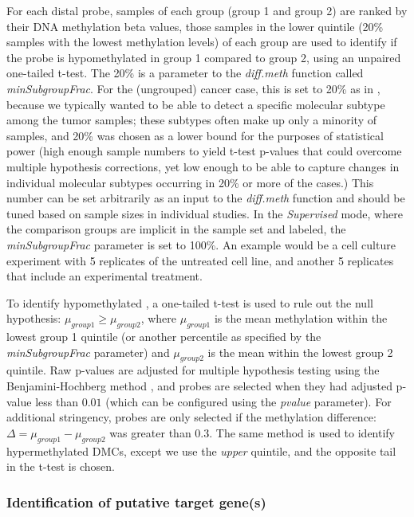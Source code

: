 For each distal probe, samples of each group (group 1 and group 2) are ranked by their DNA methylation beta values, those samples in the lower quintile (20\% samples with the lowest methylation levels) of each group are used to identify if the probe is hypomethylated in group 1 compared to group 2, using an unpaired one-tailed t-test. The 20\% is a parameter to the \textit{diff.meth} function called \textit{minSubgroupFrac}. For the (ungrouped) cancer case, this is set to 20\% as in , because we typically wanted to be able to detect a specific molecular subtype among the tumor samples; these subtypes often make up only a minority of samples, and 20\% was chosen as a lower bound for the purposes of statistical power (high enough sample numbers to yield t-test p-values that could overcome multiple hypothesis corrections, yet low enough to be able to capture changes in individual molecular subtypes occurring in 20\% or more of the cases.) This number can be set arbitrarily as an input to the \textit{diff.meth} function and should be tuned based on sample sizes in individual studies. In the \textit{Supervised} mode, where the comparison groups are implicit in the sample set and labeled, the \textit{minSubgroupFrac} parameter is set to 100\%.  An example would be a cell culture experiment with 5 replicates of the untreated cell line, and another 5 replicates that include an experimental treatment.

To identify hypomethylated , a one-tailed t-test is used to rule out the null hypothesis: $\mu_{group1} \geq \mu_{group2}$, where $\mu_{group1}$ is the mean methylation within the lowest group 1 quintile (or another percentile as specified by the \textit{minSubgroupFrac} parameter) and $\mu_{group2}$ is the mean within the lowest group 2 quintile. Raw p-values are adjusted for multiple hypothesis testing using the Benjamini-Hochberg method \cite{benjamini1995controlling}, and probes are selected when they had adjusted p-value less than $0.01$ (which can be configured using the \textit{pvalue} parameter). For additional stringency, probes are only selected if the methylation difference: $\Delta = \mu_{group1} - \mu_{group2}$ was greater than $0.3$. The same method is used to identify hypermethylated DMCs, except we use the \textit{upper} quintile, and the opposite tail in the t-test is chosen.

\subsubsection*{Identification of putative target gene(s)} 

